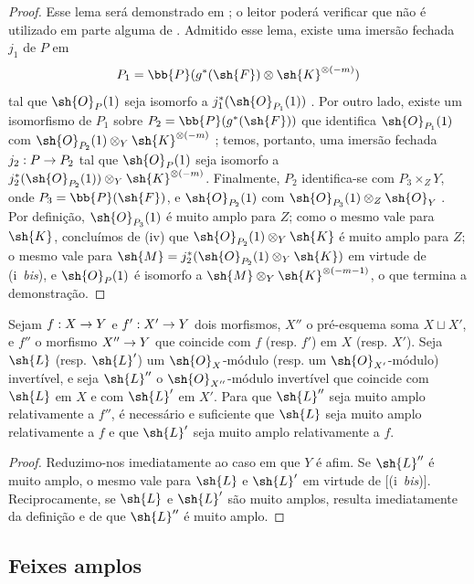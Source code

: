 \documentclass[oneside,10pt]{amsart}
\makeatletter
\newcommand{\ega@arrow}[2]{\mathchoice{#1}{#2}{#2}{#2}}
\renewcommand{\to}{\ega@arrow{\longrightarrow}{\rightarrow}}
\newcommand{\oldpage}[2][]{\marginnote{\normalfont\footnotesize\textbf{#1}~|~#2}\ignorespaces}
\let\EGAOriginalLabel\label
\renewcommand{\label}[1]{\phantomsection\EGAOriginalLabel{#1}}
\makeatother
\begin{document}
\begin{proof}
Esse lema será demonstrado em ;
o leitor poderá verificar que  não é utilizado em parte alguma de .
\oldpage[II]{83}
Admitido esse lema, existe uma imersão fechada $j_1$ de $P$ em
\[
  P_1=\bb{P}(g^*(\sh{F})\otimes\sh{K}^{\otimes(-m)})
\]
tal que $\sh{O}_P(1)$ seja isomorfo a $j_1^*(\sh{O}_{P_1}(1))$ .
Por outro lado, existe um isomorfismo de $P_1$ sobre $P_2=\bb{P}(g^*(\sh{F}))$ que identifica $\sh{O}_{P_1}(1)$ com $\sh{O}_{P_2}(1)\otimes_Y\sh{K}^{\otimes(-m)}$ ;
temos, portanto, uma imersão fechada $j_2:P\to P_2$ tal que $\sh{O}_P(1)$ seja isomorfo a $j_2^*(\sh{O}_{P_2}(1))\otimes_Y\sh{K}^{\otimes(-m)}$.
Finalmente, $P_2$ identifica-se com $P_3\times_Z Y$, onde $P_3=\bb{P}(\sh{F})$, e $\sh{O}_{P_2}(1)$ com $\sh{O}_{P_3}(1)\otimes_Z\sh{O}_Y$ .
Por definição, $\sh{O}_{P_3}(1)$ é muito amplo para $Z$;
como o mesmo vale para $\sh{K}$, concluímos de (iv) que $\sh{O}_{P_2}(1)\otimes_Y\sh{K}$ é muito amplo para $Z$;
o mesmo vale para $\sh{M}=j_2^*(\sh{O}_{P_2}(1)\otimes_Y\sh{K})$ em virtude de (i~\emph{bis}), e $\sh{O}_P(1)$ é isomorfo a $\sh{M}\otimes_Y\sh{K}^{\otimes(-m-1)}$, o que termina a demonstração.
\end{proof}

\begin{proposition}[4.4.11]
\label{II.4.4.11}
Sejam $f:X\to Y$ e $f':X'\to Y$ dois morfismos, $X''$ o pré-esquema soma $X\sqcup X'$, e $f''$ o morfismo $X''\to Y$ que coincide com $f$ (resp. $f'$) em $X$ (resp. $X'$).
Seja $\sh{L}$ (resp. $\sh{L}'$) um $\sh{O}_X$-módulo (resp. um $\sh{O}_{X'}$-módulo) invertível, e seja $\sh{L}''$ o $\sh{O}_{X''}$-módulo invertível que coincide com $\sh{L}$ em $X$ e com $\sh{L}'$ em $X'$.
Para que $\sh{L}''$ seja muito amplo relativamente a $f''$, é necessário e suficiente que $\sh{L}$ seja muito amplo relativamente a $f$ e que $\sh{L}'$ seja muito amplo relativamente a $f$.
\end{proposition}

\begin{proof}
Reduzimo-nos imediatamente ao caso em que $Y$ é afim.
Se $\sh{L}''$ é muito amplo, o mesmo vale para $\sh{L}$ e $\sh{L}'$ em virtude de [(i~\emph{bis})].
Reciprocamente, se $\sh{L}$ e $\sh{L}'$ são muito amplos, resulta imediatamente da definição  e de  que $\sh{L}''$ é muito amplo.
\end{proof}

\subsection{Feixes amplos}
\label{subsection:II.4.5}
\end{document}
